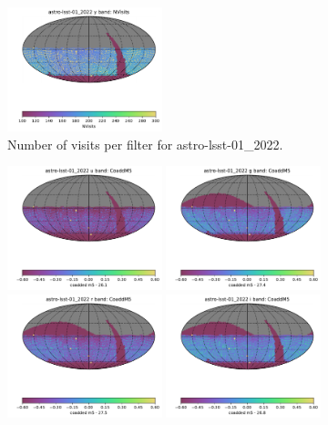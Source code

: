 \documentclass[DM,lsstdraft,authoryear,toc]{lsstdoc}
\begin{document}
\begin{figure}[ht]
\includegraphics[width=0.4\textwidth]{figures/astro-lsst-01_2022_NVisits_y_band_HEAL_SkyMap}
\caption{Number of visits per filter for astro-lsst-01\_2022.
\label{fig:baseline_nvisits}}
\end{figure}

\begin{figure}[ht]
\centering
\includegraphics[width=0.4\textwidth]{figures/astro-lsst-01_2022_CoaddM5_u_band_HEAL_SkyMap}
\includegraphics[width=0.4\textwidth]{figures/astro-lsst-01_2022_CoaddM5_g_band_HEAL_SkyMap} \\
\includegraphics[width=0.4\textwidth]{figures/astro-lsst-01_2022_CoaddM5_r_band_HEAL_SkyMap}
\includegraphics[width=0.4\textwidth]{figures/astro-lsst-01_2022_CoaddM5_i_band_HEAL_SkyMap}  \\

\end{figure}
\end{document}
